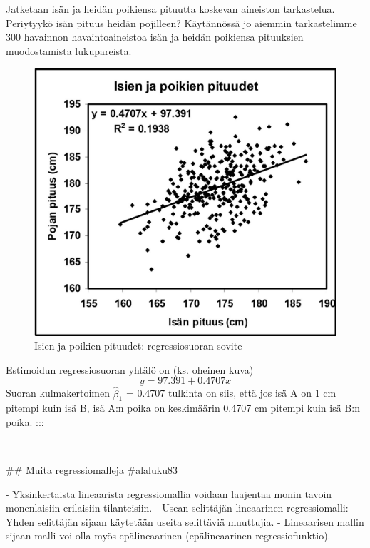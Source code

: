 \documentclass[
]{book}
\begin{document}
\begin{itemize}
Jatketaan isän ja heidän poikiensa pituutta koskevan aineiston tarkastelua. Periytyykö isän pituus heidän pojilleen? Käytännössä jo aiemmin tarkastelimme 300 havainnon havaintoaineistoa isän ja heidän poikiensa pituuksien muodostamista lukupareista.
\begin{figure}
\includegraphics[width=16.4in]{images/Sovite-isien-poikien-pituudet-Mellin} \caption{Isien ja poikien pituudet: regressiosuoran sovite}\label{fig:unnamed-chunk-17}
\end{figure}

Estimoidun regressiosuoran yhtälö on (ks. oheinen kuva)
$$
y = 97.391+ 0.4707 x
$$
Suoran kulmakertoimen $\widehat{\beta}_1$ = 0.4707 tulkinta on siis, että jos isä A on 1 cm pitempi kuin isä B, isä A:n poika on keskimäärin 0.4707 cm pitempi kuin isä B:n poika.
:::

\
\

## Muita regressiomalleja {#alaluku83}

- Yksinkertaista lineaarista regressiomallia voidaan laajentaa monin tavoin monenlaisiin erilaisiin tilanteisiin.
  - Usean selittäjän lineaarinen regressiomalli: Yhden selittäjän sijaan käytetään useita selittäviä muuttujia.
  - Lineaarisen mallin sijaan malli voi olla myös epälineaarinen (epälineaarinen regressiofunktio).


\end{itemize}
\end{document}
